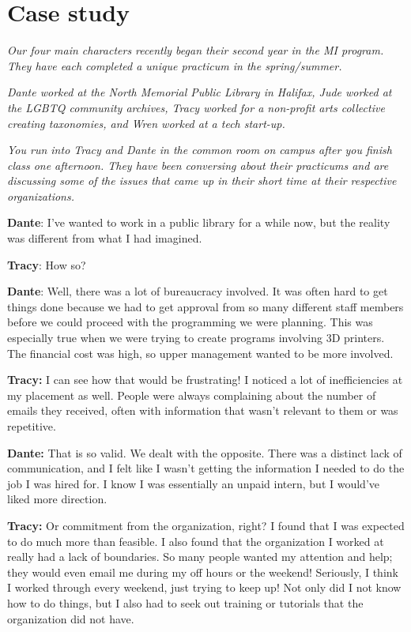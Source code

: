 \documentclass[
  letterpaper,
  DIV=11,
  numbers=noendperiod]{scrreprt}
\begin{document}
\section{Case study}\label{case-study-2}

\emph{Our four main characters recently began their second year in the
MI program. They have each completed a unique practicum in the
spring/summer.}

\emph{Dante worked at the North Memorial Public Library in Halifax, Jude
worked at the LGBTQ community archives, Tracy worked for a non-profit
arts collective creating taxonomies, and Wren worked at a tech
start-up.}

\emph{You run into Tracy and Dante in the common room on campus after
you finish class one afternoon. They have been conversing about their
practicums and are discussing some of the issues that came up in their
short time at their respective organizations.}

\textbf{Dante}: I've wanted to work in a public library for a while now,
but the reality was different from what I had imagined.

\textbf{Tracy}: How so?

\textbf{Dante}: Well, there was a lot of bureaucracy involved. It was
often hard to get things done because we had to get approval from so
many different staff members before we could proceed with the
programming we were planning. This was especially true when we were
trying to create programs involving 3D printers. The financial cost was
high, so upper management wanted to be more involved.

\textbf{Tracy:} I can see how that would be frustrating! I noticed a lot
of inefficiencies at my placement as well. People were always
complaining about the number of emails they received, often with
information that wasn't relevant to them or was repetitive.

\textbf{Dante:} That is so valid. We dealt with the opposite. There was
a distinct lack of communication, and I felt like I wasn't getting the
information I needed to do the job I was hired for. I know I was
essentially an unpaid intern, but I would've liked more direction.

\textbf{Tracy:} Or commitment from the organization, right? I found that
I was expected to do much more than feasible. I also found that the
organization I worked at really had a lack of boundaries. So many people
wanted my attention and help; they would even email me during my off
hours or the weekend! Seriously, I think I worked through every weekend,
just trying to keep up! Not only did I not know how to do things, but I
also had to seek out training or tutorials that the organization did not
have.
\end{document}
